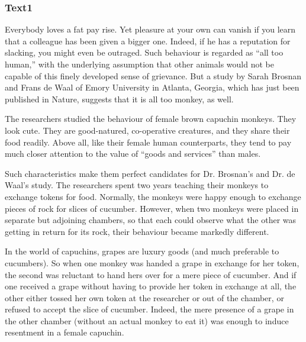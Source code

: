 \documentclass[a4paper]{article}
\begin{document}
\subsubsection{Text1}

\par
Everybody loves a fat pay rise. Yet pleasure at your own can vanish if you learn that a colleague has been given a bigger one. Indeed, if he has a reputation for slacking, you might even be outraged. Such behaviour is regarded as “all too human,” with the underlying assumption that other animals would not be capable of this finely developed sense of grievance. But a study by Sarah Brosnan and Frans de Waal of Emory University in Atlanta, Georgia, which has just been published in Nature, suggests that it is all too monkey, as well.

\par
The researchers studied the behaviour of female brown capuchin monkeys. They look cute. They are good-natured, co-operative creatures, and they share their food readily. Above all, like their female human counterparts, they tend to pay much closer attention to the value of “goods and services” than males.

\par
Such characteristics make them perfect candidates for Dr. Brosnan’s and Dr. de Waal’s study. The researchers spent two years teaching their monkeys to exchange tokens for food. Normally, the monkeys were happy enough to exchange pieces of rock for slices of cucumber. However, when two monkeys were placed in separate but adjoining chambers, so that each could observe what the other was getting in return for its rock, their behaviour became markedly different.

\par
In the world of capuchins, grapes are luxury goods (and much preferable to cucumbers). So when one monkey was handed a grape in exchange for her token, the second was reluctant to hand hers over for a mere piece of cucumber. And if one received a grape without having to provide her token in exchange at all, the other either tossed her own token at the researcher or out of the chamber, or refused to accept the slice of cucumber. Indeed, the mere presence of a grape in the other chamber (without an actual monkey to eat it) was enough to induce resentment in a female capuchin.
\end{document}
